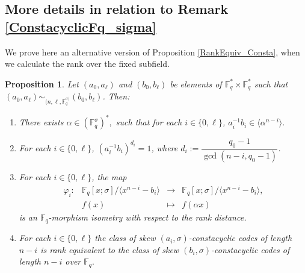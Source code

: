 \documentclass[12pt,paper]{article}
\theoremstyle{plain}
\newtheorem{proposition}[theorem]{Proposition}
\newcommand{\Fq}{\mathbb{F}_{q}}
\begin{document}
\subsection{More details in relation to Remark \ref{ConstacyclicFq_sigma}}
We prove here an alternative version of Proposition \ref{RankEquiv_Consta}, when we calculate the rank over the fixed subfield.
 \begin{proposition}\label{PropFq_sigma}
Let $ (a_0, a_{\ell}) $ and $ (b_0, b_{\ell}) $ be elements of $ \Fq^{*} \times \Fq^{*} $ such that $ (a_0, a_{\ell}) \sim_{(n, \ell,\Fq^{\sigma)}} (b_0, b_{\ell}) $. Then:
\begin{enumerate}
    \item There exists $\alpha\in (\Fq^{\sigma})^{*} ,$ such that for each $ i \in \{0, \ell\} $, $ a_i^{-1} b_i \in \langle \alpha^{n-i} \rangle.$
    \item For each $ i \in \{0, \ell\} $, $ (a_i^{-1} b_i)^{d_i} = 1 $, where $ d_i := \dfrac{q_0-1}{\gcd(n-i, q_0-1)} $.
    \item For each $ i \in \{0, \ell\} $, the map 
    \begin{equation*}
  	\begin{array}{cccc}
  	\varphi_{i}:& \mathbb{F}_q[x;\sigma] /\langle x^{n-i}-b_i\rangle  &\longrightarrow & \mathbb{F}_q[x;\sigma] /\langle
    x^{n-i}-b_i\rangle, \\ 
  	& f(x)& \longmapsto &  f(\alpha x)  
  	\end{array}
  	\end{equation*} 
is an $\mathbb{F}_q$-morphism isometry  with respect to the rank  distance.
    
    \item For each $ i \in \{0, \ell\} $ the class of skew  $(a_i,\sigma)$-constacyclic codes of length $n-i$ is { rank equivalent} to the class of skew   $(b_i,\sigma)$-constacyclic codes of length $n-i$  over $\Fq.$ 
\end{enumerate}
\end{proposition}
\end{document}
